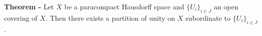 \documentclass[12pt]{article}
\begin{document}
{\bf Theorem -} Let $X$ be a paracompact Hausdorff space and $\{U_i\}_{i \in J}$ an open covering of $X$. Then there exists a partition of unity on $X$ subordinate to $\{U_i\}_{i \in J}$.
\end{document}
